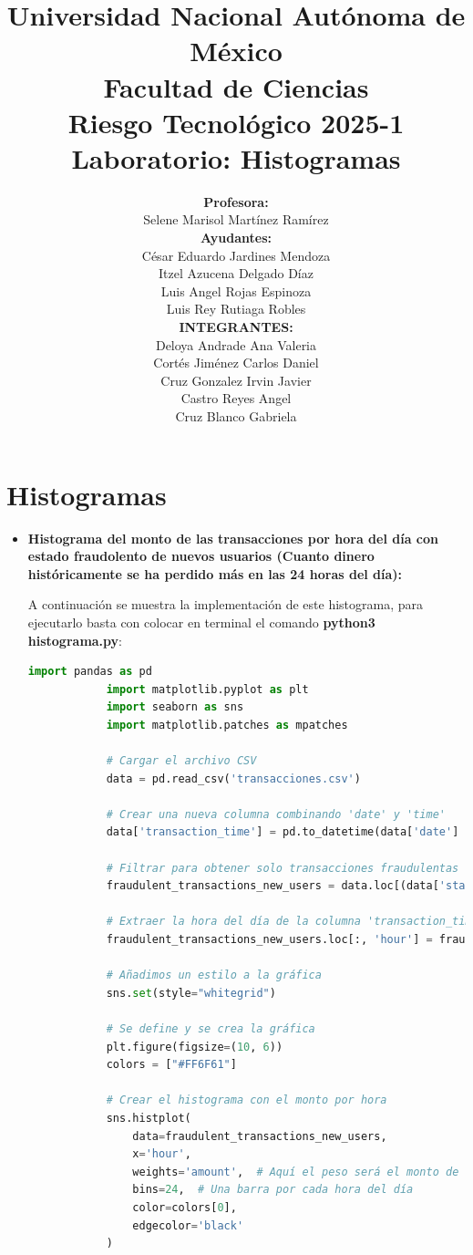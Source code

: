 \documentclass{article}
\title{Universidad Nacional Autónoma de México \\\bigskip Facultad de Ciencias \\\bigskip Riesgo Tecnológico 2025-1 \\\bigskip \textbf{Laboratorio: Histogramas}}
\author{\textbf{Profesora:} \\\bigskip Selene Marisol Martínez Ramírez \\\bigskip \textbf{Ayudantes:} \\\bigskip  César Eduardo Jardines Mendoza \\\bigskip Itzel Azucena Delgado Díaz \\\bigskip Luis Angel Rojas Espinoza \\\bigskip Luis Rey Rutiaga Robles \\\bigskip \textbf{INTEGRANTES:} \\\bigskip Deloya Andrade Ana Valeria \\\bigskip Cortés Jiménez Carlos Daniel \\\bigskip Cruz Gonzalez Irvin Javier \\\bigskip Castro Reyes Angel \\\bigskip Cruz Blanco Gabriela}
\begin{document}
\maketitle

\newpage
 
\section{Histogramas}

\begin{itemize}
    \item \textbf{Histograma del monto de las transacciones por hora del día con estado fraudolento de nuevos usuarios (Cuanto dinero históricamente se ha perdido más en las 24 horas del día):}

        A continuación se muestra la implementación de este histograma, para ejecutarlo basta con colocar en terminal el comando \textbf{python3 histograma.py}:

        \begin{lstlisting}[language=Python, caption=Implementación del Histograma del monto de transacciones por hora del día]
            import pandas as pd
            import matplotlib.pyplot as plt
            import seaborn as sns
            import matplotlib.patches as mpatches
            
            # Cargar el archivo CSV
            data = pd.read_csv('transacciones.csv')
            
            # Crear una nueva columna combinando 'date' y 'time'
            data['transaction_time'] = pd.to_datetime(data['date'] + ' ' + data['time'], format='%d/%m/%Y %H:%M')
            
            # Filtrar para obtener solo transacciones fraudulentas de nuevos usuarios
            fraudulent_transactions_new_users = data.loc[(data['status'] == 'fraudulent') & (data['new_user'] == True)].copy()
            
            # Extraer la hora del día de la columna 'transaction_time'
            fraudulent_transactions_new_users.loc[:, 'hour'] = fraudulent_transactions_new_users['transaction_time'].dt.hour
            
            # Añadimos un estilo a la gráfica
            sns.set(style="whitegrid")
            
            # Se define y se crea la gráfica
            plt.figure(figsize=(10, 6))
            colors = ["#FF6F61"]
            
            # Crear el histograma con el monto por hora
            sns.histplot(
                data=fraudulent_transactions_new_users,
                x='hour', 
                weights='amount',  # Aquí el peso será el monto de la transacción
                bins=24,  # Una barra por cada hora del día
                color=colors[0],
                edgecolor='black'
            )
            

\end{lstlisting}
\end{itemize}
\end{document}
